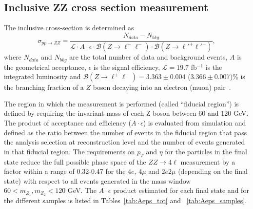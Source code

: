 \subsection{Inclusive ZZ cross section measurement}

The inclusive cross-section is determined as 
$$\sigma_{pp\to ZZ} = \frac{N_{data}-N_{bkg}}{\mathcal{L}\cdot A \cdot \epsilon \cdot \mathcal{B}(Z\to \ell^+\ell^-)\cdot\mathcal{B}(Z\to \ell'^+\ell'^-)},$$
where $N_{data}$ and $N_{bkg}$ are the total number of data and background events, $A$ is the geometrical acceptance, $\epsilon$ is the signal efficiency, $\mathcal{L} = 19.7$ fb$^{-1}$ is the integrated luminosity and $\mathcal{B}(Z\to \ell^+\ell^-) = 3.363 \pm 0.004$ ($3.366\pm 0.007$)\% is the branching fraction of a $Z$ boson decaying into an electron (muon) pair~\cite{PDG}.

The region in which the measurement is performed (called ``fiducial region'') is defined by requiring the invariant mass of each Z boson 
between 60 and 120 GeV. %
The product of acceptance and efficiency ($A\cdot\epsilon$) is evaluated from simulation and defined as the ratio between the
number of events in the fiducial region that pass the analysis selection at reconstruction level and the number of events generated in that
fiducial region. 
The requirements on $p_T$ and $\eta$ for the particles in the final state reduce the full possible phase space of the $ZZ \to 4
\ell$ measurement by a factor within a range of 0.32-0.47 for the $4e$, $4\mu$ and $2e2\mu$ (depending on
the final state) with respect to all events generated in the mass window $60 < m_{Z_1} ,m_{Z_2} < 120$ GeV.
The $A\cdot\epsilon$ product estimated for each final state and for the different samples is listed in 
Tables~\ref{tab:Aeps_tot} and ~\ref{tab:Aeps_samples}.


